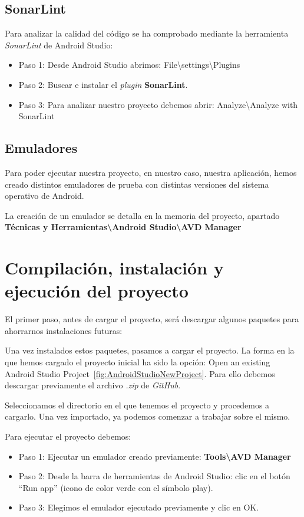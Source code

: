 \subsection{SonarLint}
Para analizar la calidad del código se ha comprobado mediante la herramienta \textit{SonarLint} de Android Studio:
\begin{itemize}
	\item Paso 1: Desde Android Studio abrimos: File\textbackslash{settings}\textbackslash{Plugins}
	\item Paso 2: Buscar e instalar el \textit{plugin} \textbf{SonarLint}.
	\item Paso 3: Para analizar nuestro proyecto debemos abrir: Analyze\textbackslash{Analyze with SonarLint}
\end{itemize}
\subsection{Emuladores}
Para poder ejecutar nuestra proyecto, en nuestro caso, nuestra aplicación, hemos creado distintos emuladores de prueba con distintas versiones del sistema operativo de Android.

La creación de un emulador se detalla en la memoria del proyecto, apartado \textbf{Técnicas y Herramientas\textbackslash{Android Studio}\textbackslash{AVD Manager}}
\section{Compilación, instalación y ejecución del proyecto}
El primer paso, antes de cargar el proyecto, será descargar algunos paquetes para ahorrarnos instalaciones futuras:

Una vez instalados estos paquetes, pasamos a cargar el proyecto. La forma en la que hemos cargado el proyecto inicial ha sido la opción: Open an existing Android Studio Project~\ref{fig:AndroidStudioNewProject}. Para ello debemos descargar previamente el archivo \textit{.zip}  de \textit{GitHub}. 

Seleccionamos el directorio en el que tenemos el proyecto y procedemos a cargarlo. Una vez importado, ya podemos comenzar a trabajar sobre el mismo.

Para ejecutar el proyecto debemos:
\begin{itemize}
	\item Paso 1: Ejecutar un emulador creado previamente: \textbf{Tools\textbackslash{AVD Manager}}
	\item Paso 2: Desde la barra de herramientas de Android Studio: clic en el botón ``Run app'' (icono de color verde con el símbolo play).
	\item Paso 3: Elegimos el emulador ejecutado previamente y clic en OK.
\end{itemize}
